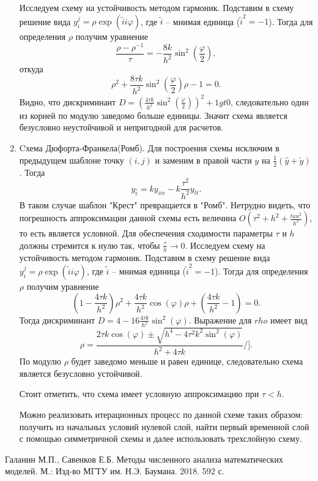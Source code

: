 \documentclass[12pt, a4paper]{article}
\renewcommand{\phi}{\varphi}
\newcommand{\widecheck}[1]{\check{#1}}
\newcommand{\down}[1]{\widecheck{#1}}
\newcommand{\pon}[1]{\mathop {#1}\limits^ \circ}
\begin{document}
\begin{enumerate}
		Исследуем схему на устойчивость методом гармоник. Подставим в схему решение вида $y_i^j = \rho \exp{(\widetilde{i} i \phi)}$, где $\widetilde{i}$ -- мнимая единица ($\widetilde{i}^2 = -1$). Тогда для определения $\rho$ получим уравнение
		\begin{equation*}
			\frac{\rho-\rho^{-1}}{\tau} = -\frac{8k}{h^2}\sin^2(\frac{\phi}{2}),
		\end{equation*}
		откуда
		\begin{equation*}
		\rho^2 + \frac{8\tau k}{h^2} \sin^2(\frac{\phi}{2}) \rho - 1 = 0.
		\end{equation*}
		Видно, что дискриминант $D = (\frac{4\tau k}{h^2} \sin^2(\frac{\phi}{2}))^2 + 1 gt 0$, следовательно один из корней по модулю заведомо больше единицы. Значит схема является безусловно неустойчивой и непригодной для расчетов.
		\item Cхема Дюфорта-Франкела(Ромб).
		Для построения схемы исключим в предыдущем шаблоне точку $(i, j)$ и заменим в правой части $y$ на $\frac{1}{2}(\hat{y} + \down{y})$. Тогда
		\begin{equation*}
			y_{\pon{t}} = k y_{\bar{x}x} - k \frac{\tau^2}{h^2} y_{\bar{t}t}.
		\end{equation*}
		В таком случае шаблон "Крест" превращается в "Ромб". Нетрудно видеть, что погрешность аппроксимации данной схемы есть величина $O(\tau^2 + h^2 + \frac{tau^2}{h^2})$, то есть является условной. Для обеспечения сходимости параметры $\tau$ и $h$ должны стремится к нулю так, чтобы $\frac{\tau}{h} \to 0$. 
		Исследуем схему на устойчивость методом гармоник. Подставим в схему решение вида $y_i^j = \rho \exp{(\widetilde{i} i \phi)}$, где $\widetilde{i}$ -- мнимая единица ($\widetilde{i}^2 = -1$). Тогда для определения $\rho$ получим уравнение
		\begin{equation*}
			(1 - \frac{4 \tau k}{h^2}) \rho^2 + \frac{4 \tau k} {h^2} \cos(\phi) \rho + (\frac{4 \tau k} {h^2} - 1) = 0.
		\end{equation*}
		Тогда дискриминант $D = 4 - 16 \frac{4 \tau k} {h^2} \sin^2(\phi)$. Выражение для $rho$ имеет вид
		\begin{equation*}
			\rho = \frac{2 \tau k \cos(\phi) \pm \sqrt{h^4 - 4\tau^2 k^2 \sin^2(\phi)}}{h^2 + 4\tau k}/].
		\end{equation*}
		По модулю $\rho$ будет заведомо меньше и равен единице, следовательно схема является безусловно устойчивой. 
		
		Стоит отметить, что схема имеет условную аппроксимацию при $\tau < h$.
		
		
		Можно реализовать итерационных процесс по данной схеме таких образом: получить из начальных условий нулевой слой, найти первый временной слой с помощью симметричной схемы и далее использовать трехслойную схему.
	\end{enumerate}
	
	
	
	\clearpage
	\begin{thebibliography}{1}
		 Галанин М.П., Савенков Е.Б. Методы численного анализа математических моделей. М.: Изд-во МГТУ им. Н.Э. Баумана. 2018. 592 с.
		
	\end{thebibliography}
	
\end{document}
